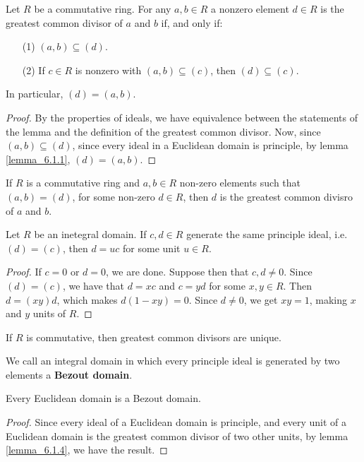 \begin{lemma}\label{lemma_6.1.2}
  Let $R$ be a commutative ring. For any $a,b \in R$ a nonzero element  $d \in
  R$ is the greatest common divisor of $a$ and $b$ if, and only if:
  \begin{enumerate}
    \item[(1)] $(a,b) \subseteq (d)$.

    \item[(2)] If $c \in R$ is nonzero with $(a,b) \subseteq (c)$, then $(d)
      \subseteq (c)$.
  \end{enumerate}
  In particular, $(d)=(a,b)$.
\end{lemma}
\begin{proof}
  By the properties of ideals, we have equivalence between the
  statements of the lemma and the definition of the greatest common
  divisor. Now, since $(a,b) \subseteq (d)$, since every ideal in a
  Euclidean domain is principle, by lemma \ref{lemma_6.1.1},
  $(d)=(a,b)$.
\end{proof}

\begin{lemma}\label{lemma_6.1.3}
  If $R$ is a commutative ring and $a,b \in R$ non-zero elements such
  that $(a,b)=(d)$, for some non-zero $d \in R$, then $d$ is the
  greatest common divisro of $a$ and $b$.
\end{lemma}

\begin{lemma}\label{lemma_6.1.4}
  Let $R$ be an inetegral domain. If $c,d \in R$ generate the same principle
  ideal, i.e. $(d)=(c)$, then $d=uc$ for some unit  $u \in R$.
\end{lemma}
\begin{proof}
  If $c=0$ or  $d=0$, we are done. Suppose then that  $c,d \neq 0$. Since
  $(d)=(c)$, we have that $d=xc$ and $c=yd$ for some  $x,y \in R$. Then
  $d=(xy)d$, which makes $d(1-xy)=0$. Since $d \neq 0$, we get $xy=1$, making
  $x$ and $y$ units of $R$.
\end{proof}
\begin{corollary}
  If $R$ is commutative, then greatest common divisors are unique.
\end{corollary}

\begin{definition}
  We call an integral domain in which every principle ideal is generated by
  two elements a \textbf{Bezout domain}.
\end{definition}

\begin{lemma}\label{lemma_6.1.5}
  Every Euclidean domain is a Bezout domain.
\end{lemma}
\begin{proof}
  Since every ideal of a Euclidean domain is principle, and every unit
  of a Euclidean domain is the greatest common divisor of two other
  units, by lemma \ref{lemma_6.1.4}, we have the result.
\end{proof}


